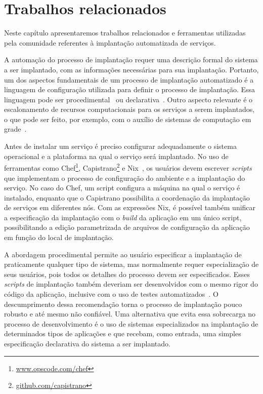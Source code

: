 
\chapter{Trabalhos relacionados}
\label{cap:relacionados}

Neste capítulo apresentaremos trabalhos relacionados e ferramentas utilizadas pela comunidade referentes à implantação automatizada de serviços. 

A automação do processo de implantação requer uma descrição formal do sistema a ser implantado, com as informações necessárias para sua implantação. Portanto, um dos aspectos fundamentais de um processo de implantação automatizado é a linguagem de configuração utilizada para definir o processo de implantação. Essa linguagem pode ser procedimental~\cite{Dolstra2005Configuration} ou declarativa~\cite{Magee1996Dynamic, Balter1998Olan}. Outro aspecto relevante é o escalonamento de recursos computacionais para os serviços a serem implantados, o que pode ser feito, por exemplo, com o auxílio de sistemas de computação em grade~\cite{Watson2006Dynasoar}.

Antes de instalar um serviço é preciso configurar adequadamente o sistema operacional e a plataforma na qual o serviço será implantado. No uso de ferramentas como Chef\footnote{\url{www.opscode.com/chef}}, Capistrano\footnote{\url{github.com/capistrano}} e Nix~\cite{Dolstra2005Configuration}, os usuários devem escrever \textit{scripts} que implementam o processo de configuração do ambiente e a implantação do serviço. No caso do Chef, um script configura a máquina na qual o serviço é instalado, enquanto que o Capistrano possibilita a coordenação da implantação de serviços em diferentes nós. Com as expressões Nix, é possível também unificar a especificação da implantação com o \textit{build} da aplicação em um único script, possibilitando a edição parametrizada de arquivos de configuração da aplicação em função do local de implantação. 

A abordagem procedimental permite ao usuário especificar a implantação de praticamente qualquer tipo de sistema, mas normalmente requer especialização de seus usuários, pois todos os detalhes do processo devem ser especificados. Esses \textit{scripts} de implantação também deveriam ser desenvolvidos com o mesmo rigor do código da aplicação, inclusive com o uso de testes automatizados~\cite{Humble2011Continuous}. O descumprimento dessa recomendação torna o processo de implantação pouco robusto e até mesmo não confiável. Uma alternativa que evita essa sobrecarga no processo de desenvolvimento é o uso de sistemas especializados na implantação de determinados tipos de aplicações e que recebam, como entrada, uma simples especificação declarativa do sistema a ser implantado.

